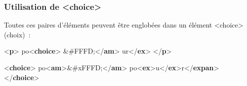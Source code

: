 \documentclass[]{beamer}\makeatletter
\begin{document}
\begin{frame}[fragile]
\frametitle{Utilisation de {\color{blue2}<choice>}}\par
Toutes ces paires d’éléments peuvent être englobées dans un élément       {\color{blue2}<choice>} (choix) : 
\bgroup\ttfamily\fontsize{8.5pt}{9pt}\selectfont\par
\begin{exampleblock}{}
\noindent\ttfamily\mbox{}{\color{blue1}<\textbf{p}>} po{\color{blue1}<\textbf{choice}>}\mbox{}\newline 
\hspace*{6pt}&#FFFD;{\color{blue1}</\textbf{am}>}\mbox{}\newline 
\hspace*{6pt}ur{\color{blue1}</\textbf{ex}>}\mbox{}\newline 
{}\mbox{}\newline 
{\color{blue1}</\textbf{p}>}
\end{exampleblock}
\par\egroup
        
\bgroup\ttfamily\fontsize{8.5pt}{9pt}\selectfont\par
\begin{exampleblock}{}
\noindent\ttfamily\mbox{}{\color{blue1}<\textbf{choice}>}\mbox{}\newline 
{}po{\color{blue1}<\textbf{am}>}&#xFFFD;{\color{blue1}</\textbf{am}>}\mbox{}\newline 
{}\mbox{}\newline 
{}po{\color{blue1}<\textbf{ex}>}u{\color{blue1}</\textbf{ex}>}r{\color{blue1}</\textbf{expan}>}\mbox{}\newline 
{\color{blue1}</\textbf{choice}>}
\end{exampleblock}
\par\egroup
       
\end{frame}
\end{document}
